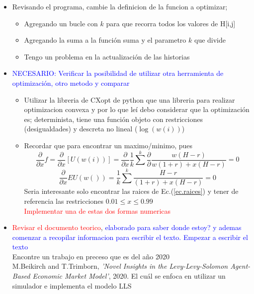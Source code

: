 \documentclass[a4paper,14pt]{article}
\begin{document}
\begin{itemize}
\item Revisando el programa, cambie la definicion de la funcion a optimizar;
\begin{itemize}
\item Agregando un bucle con $k$  para que recorra todos los valores de H[i,j] 
\item Agregando la suma a la función suma y el parametro $k$ que divide 
\item Tengo un problema en la actualización de las historias
\end{itemize}
\item \textcolor{blue}{NECESARIO: Verificar la posibilidad de utilizar otra herramienta de optimización, otro metodo y comparar}
\begin{itemize}
\item Utilizar la libreria de CXopt de python que una libreria para realizar optimizacion convexa
y por lo que leí debo considerar que la optimización es; determinista, tiene una función objeto con restricciones (desigualdades) y descreta no lineal ($\log(w(i))$) 
\item Recordar que para encontrar un maximo/minimo, pues
$$
\frac{\partial}{\partial x}f=
\frac{\partial}{\partial x}[U(w(i))]=
\frac{\partial}{\partial x}\frac{1}{k}\sum^{k}\frac{\partial}{\partial} \frac{w(H-r)}{w(1+r)+x(H-r)}=0
$$
\begin{equation}
\frac{\partial}{\partial x} EU(w())=\frac{1}{k}\sum^{k}\frac{H-r}{(1+r)+x(H-r)}=0 \label{ec.raices}
\end{equation}
Seria interesante solo encontrar las raices de Ec.(\ref{ec.raices}) y tener de referencia las restricciones $0.01\leq x \leq 0.99$\\
\textcolor{red}{Implementar una de estas dos formas numericas}
\end{itemize}
\item \textcolor{red}{Revisar el documento teorico}, \textcolor{blue}{elaborado para saber donde estoy? y ademas comenzar a recopilar informacion para escribir el texto. Empezar a escribir el texto}\\
Encontre un trabajo en preceso que es del año 2020\\

M.Beikirch and T.Trimborn, \textit{'Novel Insights in the Levy-Levy-Solomon Agent-Based Economic Market Model'}, 2020.
El cuál se enfoca en utilizar un simulador e implementa el modelo LLS  
\end{itemize}
\end{document}

